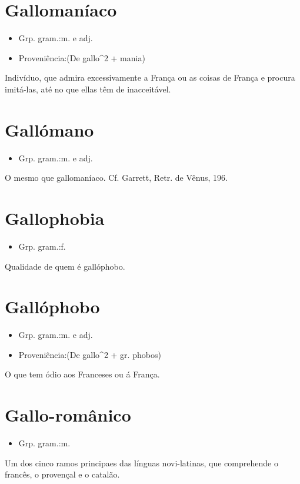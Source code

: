 \section{Gallomaníaco}
\begin{itemize}
\item {Grp. gram.:m.  e  adj.}
\end{itemize}
\begin{itemize}
\item {Proveniência:(De \textunderscore gallo\textunderscore ^2 + \textunderscore mania\textunderscore )}
\end{itemize}
Indivíduo, que admira excessivamente a França ou as coisas de França e procura imitá-las, até no que ellas têm de inacceitável.
\section{Gallómano}
\begin{itemize}
\item {Grp. gram.:m.  e  adj.}
\end{itemize}
O mesmo que \textunderscore gallomaníaco\textunderscore . Cf. Garrett, \textunderscore Retr. de Vênus\textunderscore , 196.
\section{Gallophobia}
\begin{itemize}
\item {Grp. gram.:f.}
\end{itemize}
Qualidade de quem é gallóphobo.
\section{Gallóphobo}
\begin{itemize}
\item {Grp. gram.:m.  e  adj.}
\end{itemize}
\begin{itemize}
\item {Proveniência:(De \textunderscore gallo\textunderscore ^2 + gr. \textunderscore phobos\textunderscore )}
\end{itemize}
O que tem ódio aos Franceses ou á França.
\section{Gallo-românico}
\begin{itemize}
\item {Grp. gram.:m.}
\end{itemize}
Um dos cinco ramos principaes das línguas novi-latinas, que comprehende o francês, o provençal e o catalão.
